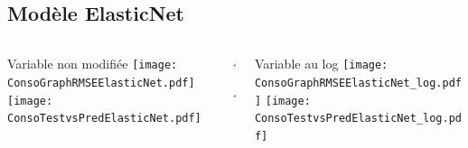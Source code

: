 \documentclass[8pt,aspectratio=169,hyperref={unicode=true}]{beamer}
\begin{document}
\subsection{Modèle ElasticNet}
\begin{frame}{\insertsubsection}
  \begin{columns}[t]
    \begin{column}{.33\textwidth}
      \centering Variable non modifiée
      \texttt{[image: ConsoGraphRMSEElasticNet.pdf]}
      \texttt{[image: ConsoTestvsPredElasticNet.pdf]}
    \end{column}
    \begin{column}{.33\textwidth}
      $\Longleftarrow$
      \scriptsize
      {\centering
        }
      

      \normalsize
      $\Longleftarrow$

      \raggedleft{$\Longrightarrow$}
      \scriptsize
      {\centering
        }
      

      \normalsize
      \raggedleft{$\Longrightarrow$}
    \end{column}
    \begin{column}{.33\textwidth}
      \centering Variable au log
      \texttt{[image: ConsoGraphRMSEElasticNet\_log.pdf]}
      \texttt{[image: ConsoTestvsPredElasticNet\_log.pdf]}
    \end{column}
  \end{columns}
\end{frame}
\end{document}
